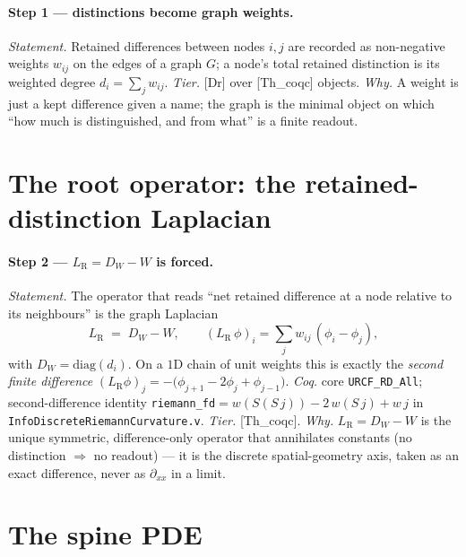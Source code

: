 \documentclass[10pt,twocolumn]{article}
\theoremstyle{definition}
\newcommand{\Thq}{\textsf{[Th\_coqc]}}   %
\newcommand{\Dr}{\textsf{[Dr]}}          %
\newcommand{\code}[1]{\texttt{#1}}
\newcommand{\LR}{L_{\mathrm R}}
\begin{document}
\paragraph{Step 1 --- distinctions become graph weights.}
\emph{Statement.} Retained differences between nodes $i,j$ are recorded as
non-negative weights $w_{ij}$ on the edges of a graph $G$; a node's total
retained distinction is its weighted degree $d_i=\sum_j w_{ij}$.
\emph{Tier.} \Dr{} over \Thq{} objects. \emph{Why.} A weight is just a kept
difference given a name; the graph is the minimal object on which ``how much is
distinguished, and from what'' is a finite readout.

\section{The root operator: the retained-distinction Laplacian}\label{sec:LR}
\paragraph{Step 2 --- $\LR=D_W-W$ is forced.}
\emph{Statement.} The operator that reads ``net retained difference at a node
relative to its neighbours'' is the graph Laplacian \cite{laplace1799,kirchhoff1847}
\[
  \LR \;=\; D_W - W,\qquad (\LR\,\phi)_i=\sum_j w_{ij}\,(\phi_i-\phi_j),
\]
with $D_W=\mathrm{diag}(d_i)$. On a $1$D chain of unit weights this is exactly
the \emph{second finite difference}
$(\LR\phi)_j=-\big(\phi_{j+1}-2\phi_j+\phi_{j-1}\big)$.
\emph{Coq.} core \code{URCF\_RD\_All}; second-difference identity
\code{riemann\_fd}$=w(S(S\,j))-2\,w(S\,j)+w\,j$ in
\code{InfoDiscreteRiemannCurvature.v}. \emph{Tier.} \Thq{}. \emph{Why.}
$\LR=D_W-W$ is the unique symmetric, difference-only operator that annihilates
constants (no distinction $\Rightarrow$ no readout) --- it is the discrete
spatial-geometry axis, taken as an exact difference, never as $\partial_{xx}$
in a limit.

\section{The spine PDE}\label{sec:spine}
\end{document}

